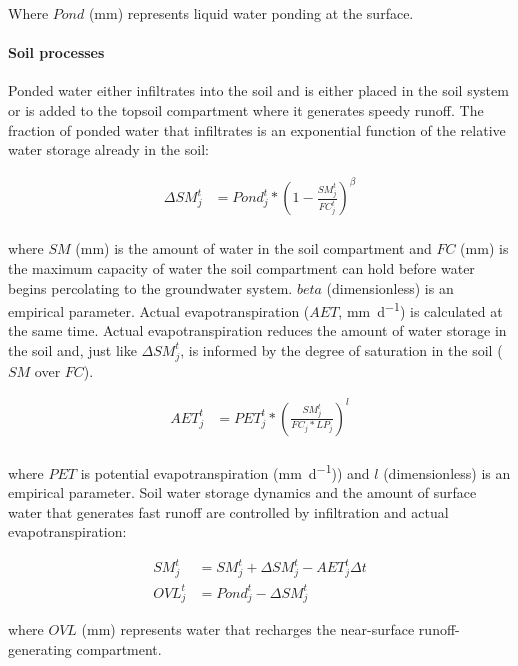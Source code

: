 \noindent Where $Pond$ (\si{\milli\metre}) represents liquid water ponding at the surface.

\paragraph{Soil processes} 

Ponded water either infiltrates into the soil and is either placed in the soil system or is added to the topsoil compartment where it generates speedy runoff. The fraction of ponded water that infiltrates is an exponential function of the relative water storage already in the soil:

\begin{align}
\Delta SM_j^t &= Pond_j^t * \left(1 - \frac{SM_j^t}{FC_j^t} \right)^\beta \\
\end{align}

\noindent where $SM$ (\si{\milli\metre}) is the amount of water in the soil compartment and $FC$ (\si{\milli\metre}) is the maximum capacity of water the soil compartment can hold before water begins percolating to the groundwater system. $beta$ (dimensionless) is an empirical parameter. Actual evapotranspiration ($AET$, \si{\milli\metre\per\day}) is calculated at the same time. Actual evapotranspiration reduces the amount of water storage in the soil and, just like $\Delta SM_j^t$, is informed by the degree of saturation in the soil ($SM$ over $FC$).

\begin{align}
AET_j^t &= PET_j^t * \left(\frac{SM_j^t}{FC_j * LP_j} \right)^l  \\
\end{align}

\noindent where $PET$ is potential evapotranspiration (\si{\milli\metre\per\day})) and $l$ (dimensionless) is an empirical  parameter. Soil water storage dynamics and the amount of surface water that generates fast runoff are controlled by infiltration and actual evapotranspiration:

\begin{align}
SM_j^t &= SM_j^{t} + \Delta SM_j^t - AET_j^t \Delta t\\
OVL_j^t &= Pond_j^t - \Delta SM_j^t
\end{align}

\noindent where $OVL$ (\si{\milli\metre}) represents water that recharges the near-surface runoff-generating compartment.

